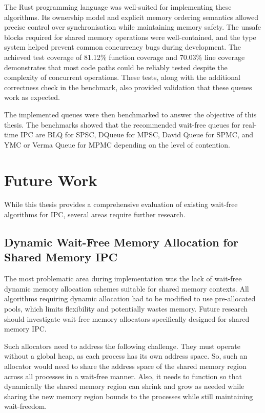The Rust programming language was well-suited for implementing these algorithms. Its ownership model and explicit memory ordering semantics allowed precise control over synchronisation while maintaining memory safety. The unsafe blocks required for shared memory operations were well-contained, and the type system helped prevent common concurrency bugs during development. The achieved test coverage of 81.12\% function coverage and 70.03\% line coverage demonstrates that most code paths could be reliably tested despite the complexity of concurrent operations. These tests, along with the additional correctness check in the benchmark, also provided validation that these queues work as expected.

The implemented queues were then benchmarked to answer the objective of this thesis. The benchmarks showed that the recommended wait-free queues for real-time \ac{IPC} are \acf{BLQ} for \ac{SPSC}, DQueue for \ac{MPSC}, David Queue for \ac{SPMC}, and \ac{YMC} or Verma Queue for \ac{MPMC} depending on the level of contention.

\section{Future Work}
While this thesis provides a comprehensive evaluation of existing wait-free algorithms for \ac{IPC}, several areas require further research.

\subsection{Dynamic Wait-Free Memory Allocation for Shared Memory \acf{IPC}}
The most problematic area during implementation was the lack of wait-free dynamic memory allocation schemes suitable for shared memory contexts. All algorithms requiring dynamic allocation had to be modified to use pre-allocated pools, which limits flexibility and potentially wastes memory. Future research should investigate wait-free memory allocators specifically designed for shared memory \ac{IPC}.

Such allocators need to address the following challenge. They must operate without a global heap, as each process has its own address space. So, such an allocator would need to share the address space of the shared memory region across all processes in a wait-free manner. Also, it needs to function so that dynamically the shared memory region can shrink and grow as needed while sharing the new memory region bounds to the processes while still maintaining wait-freedom.

